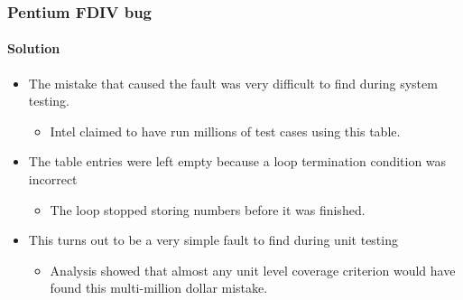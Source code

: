 \begin{frame}[hasprev=true, hasnext=false]
\frametitle{Pentium FDIV bug}
\framesubtitle{Solution}

\begin{itemize}
	\item The mistake that caused the fault was very difficult to find during
	system testing.
	\begin{itemize}
		\item Intel claimed to have run millions of test cases using this
		table.
	\end{itemize}

	\item The table entries were left empty because a loop termination
	condition was incorrect
	\begin{itemize}
		\item The loop stopped storing numbers before it was finished.
	\end{itemize}

	\item This turns out to be a very simple fault to find during unit testing
	\begin{itemize}
		\item Analysis showed that almost any unit level coverage criterion
		would have found this multi-million dollar mistake.
	\end{itemize}
\end{itemize}
\end{frame}